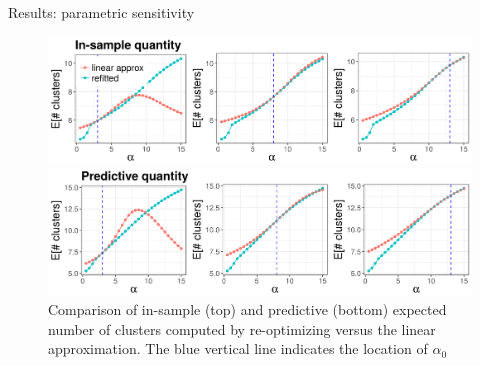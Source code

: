 \documentclass[10pt]{beamer}\usepackage[]{graphicx}\usepackage[]{color}
\newenvironment{knitrout}{}{} %
\begin{document}
\begin{frame}{Results: parametric sensitivity}

\begin{figure}
\centering
\begin{knitrout}
\color{fgcolor}

{\centering \includegraphics[width=0.98\linewidth,height=0.294\linewidth]{figure/param_sens_plot_thresh_0-1} 

}



\end{knitrout}
\begin{knitrout}
\color{fgcolor}

{\centering \includegraphics[width=0.98\linewidth,height=0.294\linewidth]{figure/param_sens_plot_thresh_0b-1} 

}



\end{knitrout}
\caption{Comparison of in-sample (top) and predictive (bottom) expected number of clusters computed by re-optimizing versus the linear approximation. 
The blue vertical line indicates the location of $\alpha_0$}
\end{figure}

\end{frame}
\end{document}
